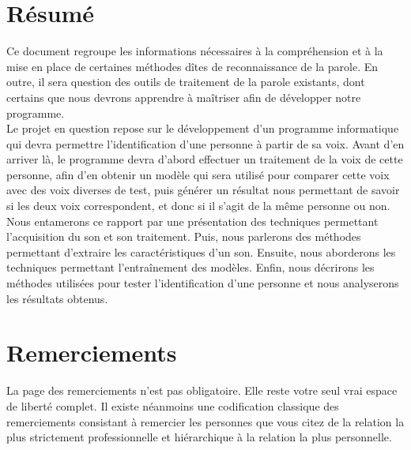 \documentclass[a4paper, 12pt]{book}
\newcommand{\listofprograms}{\listof{programslist}{Liste des codes source}}
\newcounter{program}[subsection]
\begin{document}
\chapter*{Résumé}

Ce document regroupe les informations nécessaires à la compréhension et à la mise en place de certaines méthodes dîtes de reconnaissance de la parole. En outre, il sera question des outils de traitement de la parole existants, dont certains que nous devrons apprendre à maîtriser afin de développer notre programme.\\

Le projet en question repose sur le développement d'un programme informatique qui devra permettre l'identification d'une personne à partir de sa voix. Avant d'en arriver là, le programme devra d'abord effectuer un traitement de la voix de cette personne, afin d'en obtenir un modèle qui sera utilisé pour comparer cette voix avec des voix diverses de test, puis générer un résultat nous permettant de savoir si les deux voix correspondent, et donc si il s'agit de la même personne ou non.\\

Nous entamerons ce rapport par une présentation des techniques permettant l'acquisition du son et son traitement. Puis, nous parlerons des méthodes permettant d'extraire les caractéristiques d'un son. Ensuite, nous aborderons les techniques permettant l'entraînement des modèles. Enfin, nous décrirons les méthodes utilisées pour tester l'identification d'une personne et nous analyserons les résultats obtenus. 

\chapter*{Remerciements}
 La page des
remerciements n'est pas obligatoire. Elle reste votre seul vrai espace
de liberté complet. Il existe néanmoins une codification classique des
remerciements consistant à remercier les personnes que vous citez de
la relation la plus strictement professionnelle et hiérarchique à la
relation la plus personnelle.
\tableofcontents
\listoffigures
\listofprograms
\mainmatter
\end{document}
